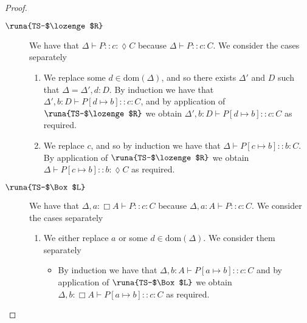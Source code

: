 \begin{lemma}
\begin{proof}
\begin{description}

\item[$\runa{TS-$\lozenge$R}$] We have that $\Delta\vdash P :: c\!:\!\lozenge C$ because $\Delta\vdash P :: c\!:\!C$. We consider the cases separately
\begin{enumerate}
    \item We replace some $d\in\text{dom}(\Delta)$, and so there exists $\Delta'$ and $D$ such that $\Delta=\Delta',d:D$. By induction we have that $\Delta',b:D\vdash P[d\mapsto b] :: c\!:\!C$, and by application of $\runa{TS-$\lozenge$R}$ we obtain $\Delta',b:D\vdash P[d\mapsto b] :: c\!:\!C$ as required.
    
    \item We replace $c$, and so by induction we have that $\Delta\vdash P[c\mapsto b] :: b\!:\!C$. By application of $\runa{TS-$\lozenge$R}$ we obtain $\Delta\vdash P[c\mapsto b] :: b\!:\!\lozenge C$ as required.
\end{enumerate}


\item[$\runa{TS-$\Box$L}$] We have that $\Delta,a:\Box A\vdash P :: c\!:\!C$ because $\Delta,a:A\vdash P :: c\!:\!C$. We consider the cases separately
\begin{enumerate}
    \item We either replace $a$ or some $d\in\text{dom}(\Delta)$. We consider them separately
    \begin{itemize}
        \item By induction we have that $\Delta,b:A\vdash P[a\mapsto b] :: c\!:\!C$ and by application of $\runa{TS-$\Box$L}$ we obtain $\Delta,b:\Box A\vdash P[a\mapsto b] :: c\!:\!C$ as required.
        

\end{itemize}
\end{enumerate}
\end{description}
\end{proof}
\end{lemma}
